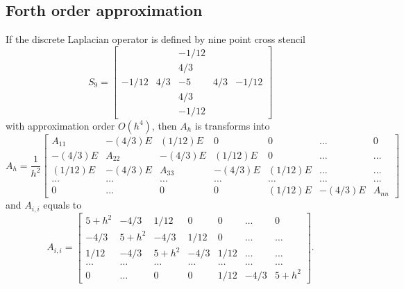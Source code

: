 \documentclass[11pt,a4paper,twoside]{article}
\begin{document}
\subsection{Forth order approximation}

If the discrete Laplacian operator is defined by nine point cross stencil
\[
S_9 =
\begin{bmatrix}
          &       &  -1/12  & &  \\
          &       &  4/3     &   & \\
-1/12 & 4/3 &  -5       & 4/3 & -1/12\\
          &       &   4/3    &    &\\
          &       &  -1/12  &    &
\end{bmatrix}
\]
with approximation order $O(h^4)$, then $A_h$ is transforms into
\[
A_h = \frac{1}{h^2}
\begin{bmatrix}
    A_{11}            & -(4/3)E    &  (1/12)E       & 0                       & 0                      & \dots  & 0 \\
    -(4/3)E            & A_{22}    & -(4/3)E        &  (1/12)E         & 0                      & \dots & \dots   \\
    (1/12)E            & -(4/3)E   &      A_{33}  & -(4/3)E            & (1/12)E             & \dots  & \dots   \\
      \dots             & \dots       & \dots                       & \dots                &    \dots             &  \dots &    \dots  \\
     0                    & \dots        &  0                             &  0                     & (1/12)E             & -(4/3)E & A_{nn}
\end{bmatrix}
\]
and $A_{i,i}$ equals to
\[
A_{i,i} = 
\begin{bmatrix}
    5 + h^2  & -4/3          &  1/12       & 0         & 0                      & \dots  & 0 \\
    -4/3         & 5 + h^2   &  -4/3        &  1/12  & 0                    & \dots & \dots   \\
    1/12        &  -4/3         & 5 + h^2  &  -4/3   &  1/12              & \dots & \dots   \\
      \dots             & \dots                 & \dots                       & \dots                &    \dots             &  \dots &    \dots  \\
     0                    & \dots                 &  0                             &  0                     & 1/12                 & -4/3    & 5 + h^2
\end{bmatrix}.
\]
\end{document}
